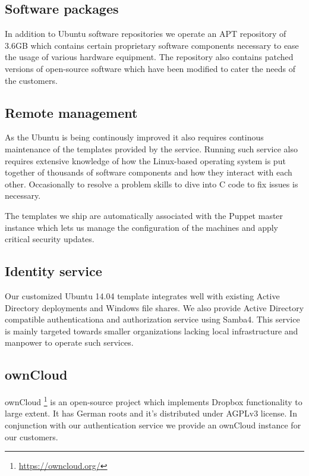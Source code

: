 \documentclass{article}
\begin{document}
\subsection{Software packages}

In addition to Ubuntu software repositories 
we operate an APT repository of 3.6GB which contains
certain proprietary software components necessary
to ease the usage of various hardware equipment.
The repository also contains patched versions of
open-source software which have been modified to cater the
needs of the customers.

\subsection{Remote management}

As the Ubuntu is being continously improved it also requires
continous maintenance of the templates provided by the service.
Running such service also requires extensive knowledge of
how the Linux-based operating system is put together of 
thousands of software components and how they interact with each other.
Occasionally to resolve a problem skills to dive into C code to fix
issues is necessary.

The templates we ship are automatically associated with
the Puppet master instance which lets us manage
the configuration of the machines and apply critical security updates.


\subsection{Identity service}

Our customized Ubuntu 14.04 template integrates
well with existing Active Directory deployments
and Windows file shares.
We also provide Active Directory compatible
authenticationa and authorization service using Samba4.
This service is mainly targeted towards
smaller organizations lacking local
infrastructure and manpower to operate such services.

\subsection{ownCloud}

ownCloud
\footnote{\url{https://owncloud.org/}}
is an open-source project which implements
Dropbox functionality to large extent.
It has German roots and it's distributed under AGPLv3 license.
In conjunction with our authentication service
we provide an ownCloud instance for our customers.
\end{document}
